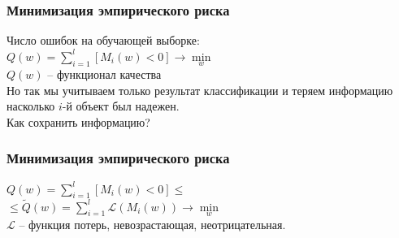 \documentclass[12pt]{beamer}
\begin{document}


\begin{frame}\frametitle{Минимизация эмпирического риска}
Число ошибок на обучающей выборке:\\
\vspace{5mm}
${Q(w) = \sum\limits_{i=1}^l \left[ M_i(w) < 0 \right] \rightarrow \min\limits_w }$\\
\vspace{3mm}
${Q(w)}$ -- функционал качества\\
\vspace{5mm}
Но так мы учитываем только результат классификации и теряем информацию насколько ${i}$-й объект был надежен.\\
\vspace{3mm}
Как сохранить информацию?

\end{frame}

\begin{frame}\frametitle{Минимизация эмпирического риска}
${Q(w) = \sum\limits_{i=1}^l \left[ M_i(w) < 0 \right] \leq}$\\ \vspace{3mm}
${\leq \widetilde{Q}(w) = \sum\limits_{i=1}^l \mathcal{L}(M_i(w)) \rightarrow \min\limits_w }$\\\vspace{3mm}
$\mathcal{L}$ -- функция потерь, невозрастающая, неотрицательная.\\ 
\end{frame}
\end{document}
